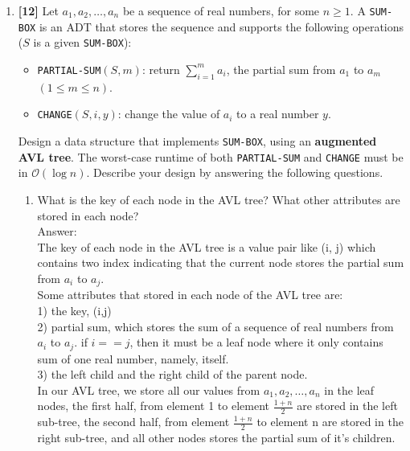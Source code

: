 \documentclass{assignment-263}
\begin{document}
\think
\begin{enumerate}
	\item \textbf{[12]} Let $a_1, a_2, \dots, a_n$ be a sequence of real
		numbers, for some $n \ge 1$.  A \texttt{SUM-BOX} is an ADT that
		stores the sequence and supports the following operations ($S$ is a
		given \texttt{SUM-BOX}):
		\begin{itemize}

			\item \texttt{PARTIAL-SUM}$(S, m)$: return $\sum_{i=1}^m a_i$,
				the partial sum from $a_1$ to $a_m$ $(1\le m\le n)$.

			\item \texttt{CHANGE}$(S, i, y)$: change the value of $a_i$ to a
				real number $y$.

		\end{itemize}
		Design a data structure that implements \texttt{SUM-BOX}, using an
		\textbf{augmented AVL tree}. The worst-case runtime of both
		\texttt{PARTIAL-SUM} and \texttt{CHANGE} must be in
		$\mathcal{O}(\log n)$. Describe your design by answering the
		following questions.
		\begin{enumerate}
			\item What is the key of each node in the AVL tree? What other
				attributes are stored in each node?\\
				Answer:\\
				The key of each node in the AVL tree is a value pair like (i, j) which contains two index indicating that the current node stores the partial sum from $a_i$ to $a_j$.\\
				Some attributes that stored in each node of the AVL tree are:\\
				1) the key, (i,j)\\
                2) partial sum, which stores the sum of a sequence of real numbers from $a_i$ to $a_j$. if $i == j$, then it must be a leaf node where it only contains sum of one real number, namely, itself. \\
                3) the left child and the right child of the parent node.\\
                In our AVL tree, we store all our values from $a_1, a_2, \dots, a_n$ in the leaf nodes, the first half, from element 1 to element $\frac{1+n}{2}$ are stored in the left sub-tree, the second half, from element $\frac{1+n}{2}$ to element n are stored in the right sub-tree, and all other nodes stores the partial sum of it's children.\\



\end{enumerate}
\end{enumerate}
\end{document}
